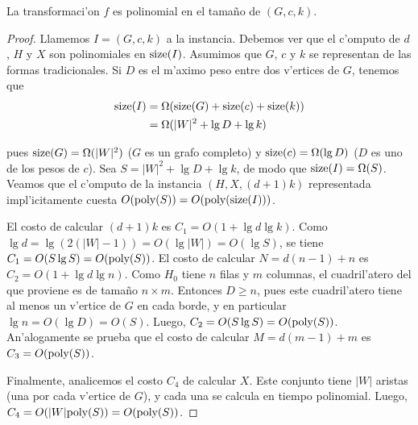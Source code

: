 \begin{lemma}
\label{le:transformacion_polinomial_sr_grillas}
La transformaci'on $f$ es polinomial en el tama\~no de $(G, c, k)$.

\begin{proof}
Llamemos $I = (G, c, k)$ a la instancia. Debemos ver que el c'omputo de $d$, $H$ y $X$ son polinomiales en $\textnormal{size}(I)$. Asumimos que $G$, $c$ y $k$ se representan de las formas tradicionales. Si $D$ es el m'aximo peso entre dos v'ertices de $G$, tenemos que
\begin{align*}
\textnormal{size}(I) &= \Omega(\textnormal{size}(G) + \textnormal{size}(c) + \textnormal{size}(k))\\
&= \Omega(|W|^2 + \lg D + \lg k)
\end{align*}

\noindent
pues $\textnormal{size}(G) = \Omega(|W|^2)$ ($G$ es un grafo completo) y $\textnormal{size}(c) = \Omega(\lg D)$ ($D$ es uno de los pesos de $c$). Sea $S = |W|^2 + \lg D + \lg k$, de modo que $\textnormal{size}(I) = \Omega(S)$. Veamos que el c'omputo de la instancia $(H, X, (d + 1)k)$ representada impl'icitamente cuesta $O(\textnormal{poly}(S)) = O(\textnormal{poly}(\textnormal{size}(I)))$.

El costo de calcular $(d + 1)k$ es $C_1 = O(1 + \lg d \lg k)$. Como $\lg d = \lg(2(|W| - 1)) = O(\lg |W|) = O(\lg S)$, se tiene $C_1 = O(S \lg S) = O(\textnormal{poly}(S))$. El costo de calcular $N = d(n - 1) + n$ es $C_2 = O(1 + \lg d \lg n)$. Como $H_0$ tiene $n$ filas y $m$ columnas, el cuadril'atero del que proviene es de tama\~no $n \times m$. Entonces $D \geq n$, pues este cuadril'atero tiene al menos un v'ertice de $G$ en cada borde, y en particular $\lg n = O(\lg D) = O(S)$. Luego, $C_2 = O(S \lg S) = O(\textnormal{poly}(S))$. An'alogamente se prueba que el costo de calcular $M = d(m - 1) + m$ es $C_3 = O(\textnormal{poly}(S))$.

Finalmente, analicemos el costo $C_4$ de calcular $X$. Este conjunto tiene $|W|$ aristas (una por cada v'ertice de $G$), y cada una se calcula en tiempo polinomial. Luego, $C_4 = O(|W| \textnormal{poly}(S)) = O(\textnormal{poly}(S))$.
\end{proof}
\end{lemma}

